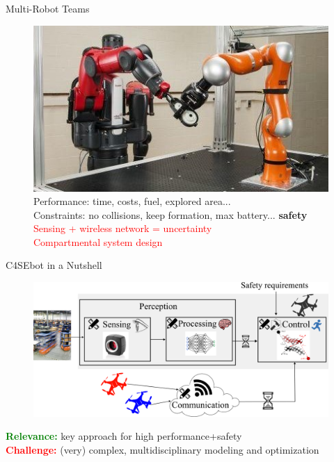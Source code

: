 \documentclass[10pt,xcolor={dvipsnames}]{beamer}
\newcommand{\red}[1]{\textcolor{red}{#1}}
\newcommand{\green}[1]{\textcolor{Green}{#1}}
\begin{document}
	\begin{frame}{Multi-Robot Teams}
		
		\begin{figure}
			\centering
			\includegraphics[width=.5\linewidth]{multi_robot_1}\\\vspace{4mm}
			Performance: time, costs, fuel, explored area...\\
			Constraints: no collisions, keep formation, max battery...  \textbf{safety}\\
			\red{Sensing + wireless network = uncertainty \faThumbsODown}\\
			\red{Compartmental system design \faThumbsODown}
		\end{figure}
		
	\end{frame}
	
	\begin{frame}{C4SEbot in a Nutshell}
		
		\begin{figure}
			\centering
			\includegraphics[width=\linewidth]{scheme_robust_codesign_comm}
		\end{figure}
		
		\green{\textbf{Relevance:}} key approach for high performance+safety\\
		\red{\textbf{Challenge:}} (very) complex, multidisciplinary modeling and optimization
		
	\end{frame}
	
\end{document}
